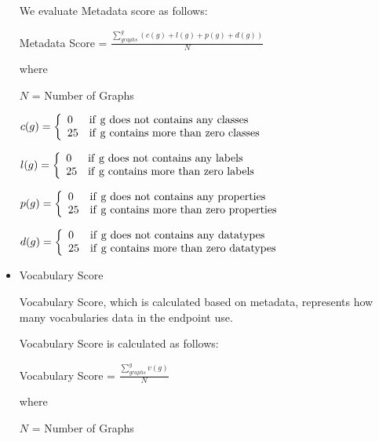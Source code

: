 \documentclass[11pt,a4paper]{article}
\begin{document}
\begin{itemize}
  We evaluate Metadata score as follows:

  \begin{mdframed}
    \center
Metadata Score = $\frac{\displaystyle \sum_{graphs}^{g}(c(g) + l(g) + p(g) + d(g))}{N}$

where

$N$ = Number of Graphs

$c(g) = \left\{
        \begin{array}{ll}
            0   & {\rm if~g~does~not~contains~any~classes} \\
            25  & {\rm if~g~contains~more~than~zero~classes}
        \end{array}
        \right.$

$l(g) = \left\{
        \begin{array}{ll}
            0   & {\rm if~g~does~not~contains~any~labels} \\
            25  & {\rm if~g~contains~more~than~zero~labels}
        \end{array}
        \right.$

$p(g) = \left\{
        \begin{array}{ll}
            0   & {\rm if~g~does~not~contains~any~properties} \\
            25  & {\rm if~g~contains~more~than~zero~properties}
        \end{array}
        \right.$

$d(g) = \left\{
        \begin{array}{ll}
            0   & {\rm if~g~does~not~contains~any~datatypes} \\
            25  & {\rm if~g~contains~more~than~zero~datatypes}
        \end{array}
        \right.$

  \end{mdframed}

\item Vocabulary Score

  Vocabulary Score, which is calculated based on metadata, represents how many vocabularies data in the endpoint use.

  Vocabulary Score is calculated as follows:

  \begin{mdframed}
    \center

Vocabulary Score = $\frac{\displaystyle \sum_{graphs}^{g}v(g)}{N}$

where

$N$ = Number of Graphs


\end{mdframed}
\end{itemize}
\end{document}
